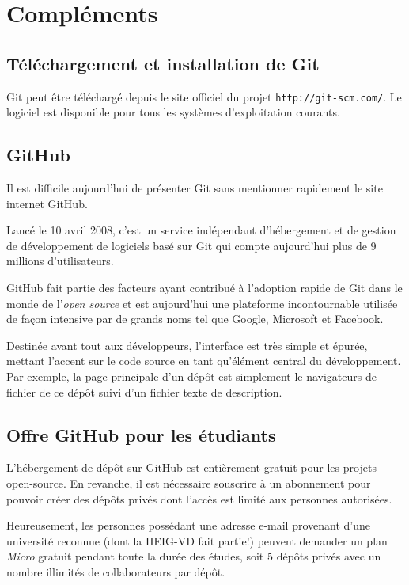 \documentclass[11pt,a4paper]{article}
\begin{document}
\pagebreak
{}
\section{Compléments}

\subsection{Téléchargement et installation de Git}

Git peut être téléchargé depuis le site officiel du projet {\tt http://git-scm.com/}.
Le logiciel est disponible pour tous les systèmes d'exploitation courants.

\subsection{GitHub}

Il est difficile aujourd'hui de présenter Git sans mentionner rapidement le site internet GitHub.

Lancé le 10 avril 2008, c'est un service indépendant d'hébergement et de gestion de développement de logiciels basé sur Git qui compte aujourd'hui plus de 9 millions d'utilisateurs.

GitHub fait partie des facteurs ayant contribué à l'adoption rapide de Git dans le monde de l'\textit{open source} et est aujourd'hui une plateforme incontournable utilisée de façon intensive par de grands noms tel que Google, Microsoft et Facebook. 

Destinée avant tout aux développeurs, l'interface est très simple et épurée, mettant l'accent sur le code source en tant qu'élément central du développement. Par exemple, la page principale d'un dépôt est simplement le navigateurs de fichier de ce dépôt suivi d'un fichier texte de description.

\subsection{Offre GitHub pour les étudiants}

L'hébergement de dépôt sur GitHub est entièrement gratuit pour les projets open-source.
En revanche, il est nécessaire souscrire à un abonnement pour pouvoir créer des dépôts privés dont l'accès est limité aux personnes autorisées.

Heureusement, les personnes possédant une adresse e-mail provenant d'une université reconnue (dont la HEIG-VD fait partie!) peuvent demander un plan \textit{Micro} gratuit pendant toute la durée des études, soit 5 dépôts privés avec un nombre illimités de collaborateurs par dépôt.
\end{document}
